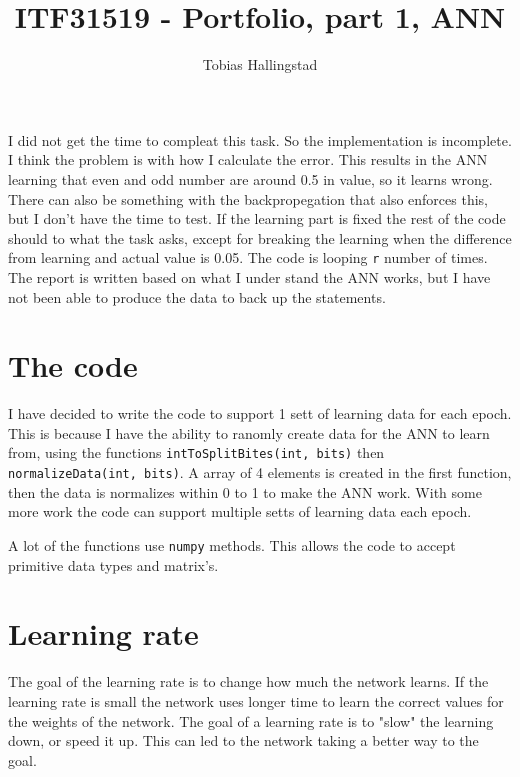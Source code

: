 \documentclass[10pt]{article}
\title{ITF31519 - Portfolio, part 1, ANN}
\author{Tobias Hallingstad}
\begin{document}
    \begin{titlepage}
        \maketitle
    \end{titlepage}


    I did not get the time to compleat this task. So the implementation is incomplete. I think the problem is with how I calculate the error. This results in the ANN learning that even and odd number are around 0.5 in value, so it learns wrong. There can also be something with the backpropegation that also enforces this, but I don't have the time to test. If the learning part is fixed the rest of the code should to what the task asks, except for breaking the learning when the difference from learning and actual value is 0.05. The code is looping \texttt{r} number of times. The report is written based on what I under stand the ANN works, but I have not been able to produce the data to back up the statements.

    \section{The code}
    I have decided to write the code to support 1 sett of learning data for each epoch. This is because I have the ability to ranomly create data for the ANN to learn from, using the functions \texttt{intToSplitBites(int, bits)} then \texttt{normalizeData(int, bits)}. A array of 4 elements is created in the first function, then the data is normalizes within 0 to 1 to make the ANN work. With some more work the code can support multiple setts of learning data each epoch.

    A lot of the functions use \texttt{numpy} methods. This allows the code to accept primitive data types and matrix's. 


    \section{Learning rate}
    The goal of the learning rate is to change how much the network learns. If the learning rate is small the network uses longer time to learn the correct values for the weights of the network. The goal of a learning rate is to "slow" the learning down, or speed it up. This can led to the network taking a better way to the goal.
\end{document}
